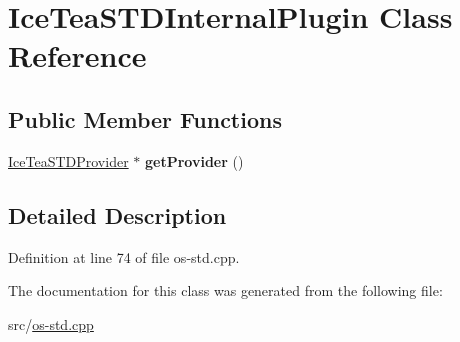 \hypertarget{class_ice_tea_s_t_d_internal_plugin}{}\section{Ice\+Tea\+S\+T\+D\+Internal\+Plugin Class Reference}
\label{class_ice_tea_s_t_d_internal_plugin}
\subsection*{Public Member Functions}
\begin{DoxyCompactItemize}
\item 
\hyperlink{class_ice_tea_s_t_d_provider}{Ice\+Tea\+S\+T\+D\+Provider} $\ast$ {\bfseries get\+Provider} ()\hypertarget{class_ice_tea_s_t_d_internal_plugin_a964ff13e4139488145e19c8f2f389f60}{}\label{class_ice_tea_s_t_d_internal_plugin_a964ff13e4139488145e19c8f2f389f60}

\end{DoxyCompactItemize}


\subsection{Detailed Description}


Definition at line 74 of file os-\/std.\+cpp.



The documentation for this class was generated from the following file\+:\begin{DoxyCompactItemize}
\item 
src/\hyperlink{os-std_8cpp}{os-\/std.\+cpp}\end{DoxyCompactItemize}
